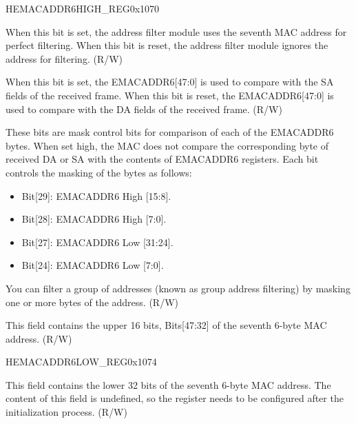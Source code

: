 \begin{register}{H}{EMACADDR6HIGH\_REG}{0x1070}\label{regdesc:EMACADDR6HIGHREG}
%
%
%
%
%
\regnewline%
\begin{regdesc}\begin{reglist}
\item [ADDRESS\_ENABLE6]When this bit is set, the address filter module uses the seventh MAC address  for perfect filtering. When this bit is reset, the address filter module ignores the address for filtering. (R/W)
\item [SOURCE\_ADDRESS6]When this bit is set, the EMACADDR6[47:0] is used to compare with the SA fields of the received frame. When this bit is reset, the EMACADDR6[47:0] is used to compare with the DA fields of the received frame. (R/W)
\item [MASK\_BYTE\_CONTROL6]These bits are mask control bits for comparison of each of the EMACADDR6 bytes. When set high, the MAC does not compare the corresponding byte of received DA or SA with the contents of EMACADDR6 registers. Each bit controls the masking of the bytes as follows: \begin{itemize}
\item Bit[29]: EMACADDR6 High [15:8]. \item Bit[28]: EMACADDR6 High [7:0]. \item Bit[27]: EMACADDR6 Low [31:24]. \item Bit[24]: EMACADDR6 Low [7:0].
\end{itemize} You can filter a group of addresses (known as group address filtering) by masking one or more bytes of the address. (R/W)
\item [MAC\_ADDRESS6\_HI]This field contains the upper 16 bits, Bits[47:32] of the seventh 6-byte MAC address. (R/W)
\end{reglist}\end{regdesc}
\end{register}

\begin{register}{H}{EMACADDR6LOW\_REG}{0x1074}\label{regdesc:EMACADDR6LOWREG}
%
\regnewline%
\begin{regdesc}\begin{reglist}
\item [EMACADDR6LOW\_REG]This field contains the lower 32 bits of the seventh 6-byte MAC address. The content of this field is undefined, so the register needs to be configured after the initialization process. (R/W)
\end{reglist}\end{regdesc}
\end{register}


